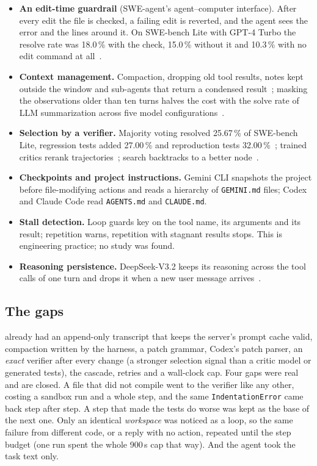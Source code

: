 \begin{itemize}
  \item \textbf{An edit-time guardrail} (SWE-agent's agent--computer interface). After every edit the file is checked, a failing edit
    is reverted, and the agent sees the error and the lines around it. On SWE-bench Lite with GPT-4 Turbo the resolve rate was 18.0\,\%
    with the check, 15.0\,\% without it and 10.3\,\% with no edit command at all~\cite{yang2024sweagent}.
  \item \textbf{Context management.} Compaction, dropping old tool results, notes kept outside the window and sub-agents that
    return a condensed result~\cite{anthropic2025context}; masking the observations older than ten turns halves the cost with the
    solve rate of LLM summarization across five model configurations~\cite{lindenbauer2025complexity}.
  \item \textbf{Selection by a verifier.} Majority voting resolved 25.67\,\% of SWE-bench Lite, regression tests added 27.00\,\% and
    reproduction tests 32.00\,\%~\cite{xia2024agentless}; trained critics rerank trajectories~\cite{pan2024swegym}; search backtracks to a
    better node~\cite{antoniades2025sweSearch}.
  \item \textbf{Checkpoints and project instructions.} Gemini CLI snapshots the project before file-modifying actions and reads a
    hierarchy of \texttt{GEMINI.md} files; Codex and Claude Code read \texttt{AGENTS.md} and \texttt{CLAUDE.md}.
  \item \textbf{Stall detection.} Loop guards key on the tool name, its arguments and its result; repetition warns, repetition with
    stagnant results stops. This is engineering practice; no study was found.
  \item \textbf{Reasoning persistence.} DeepSeek-V3.2 keeps its reasoning across the tool calls of one turn and drops it when a new user
    message arrives~\cite{deepseek2025v32}.
\end{itemize}

\subsection{The gaps}

\Sys{} already had an append-only transcript that keeps the server's prompt cache valid, compaction written by the harness, a patch
grammar, Codex's patch parser, an \emph{exact} verifier after every change (a stronger selection signal than a critic model or
generated tests), the cascade, retries and a wall-clock cap. Four gaps were real and are closed. A file that did not compile went to the
verifier like any other, costing a sandbox run and a whole step, and the same \texttt{IndentationError} came back step after step. A step
that made the tests do worse was kept as the base of the next one. Only an identical \emph{workspace} was noticed as a loop, so the same
failure from different code, or a reply with no action, repeated until the step budget (one run spent the whole 900\,s cap that way).
And the agent took the task text only.

